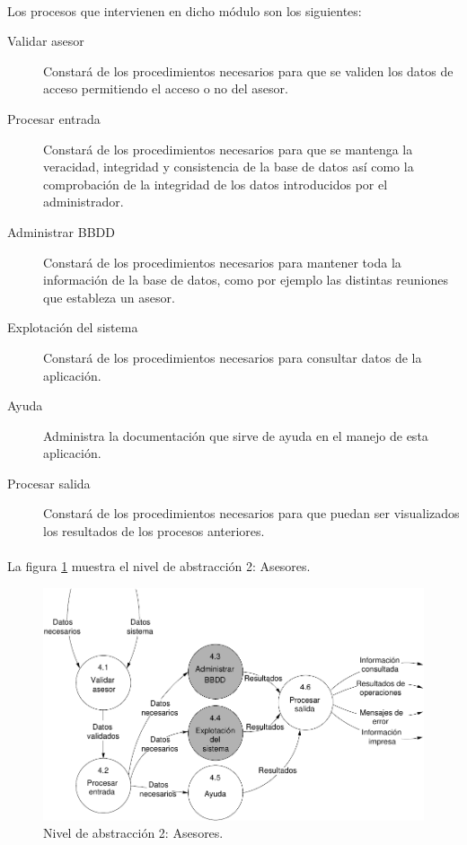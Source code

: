 \paragraph{}Los procesos que intervienen en dicho módulo son los siguientes:

\begin{description}
 \item[Validar asesor] Constará de los procedimientos necesarios para que se
      validen los datos de acceso permitiendo el acceso o no del asesor.
 \item[Procesar entrada] Constará de los procedimientos necesarios para que se
      mantenga la veracidad, integridad y consistencia de la base de datos así
      como la comprobación de la integridad de los datos introducidos por el
      administrador.
 \item[Administrar BBDD] Constará de los procedimientos necesarios para mantener
      toda la información de la base de datos, como por ejemplo las distintas
      reuniones que estableza un asesor.
 \item[Explotación del sistema]  Constará de los procedimientos necesarios para
      consultar datos de la aplicación.
 \item[Ayuda] Administra la documentación que sirve de ayuda en el manejo de
      esta aplicación.
 \item[Procesar salida] Constará de los procedimientos necesarios para que
      puedan ser visualizados los resultados de los procesos anteriores.
\end{description}

\paragraph{}La figura \ref{diagramaNivel2-Asesores} muestra el nivel de
abstracción 2: Asesores.

  \begin{figure}[!ht]
    \begin{center}
      \includegraphics[]{08.Analisis_Funcional/8.2.DFDs/Niveles/Nivel2/Diagramas/nivel2-Asesores.pdf}
      \caption{Nivel de abstracción 2: Asesores.}
      \label{diagramaNivel2-Asesores}
    \end{center}
  \end{figure}